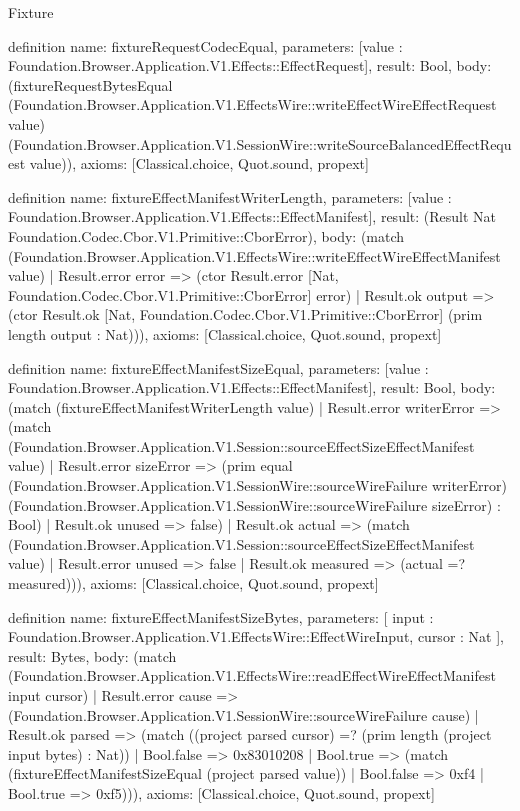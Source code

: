 \begin{lexlean}{Fixture}
\begin{semanticmodule}
definition{
  name: fixtureRequestCodecEqual,
  parameters: [value : Foundation.Browser.Application.V1.Effects::EffectRequest],
  result: Bool,
  body: (fixtureRequestBytesEqual (Foundation.Browser.Application.V1.EffectsWire::writeEffectWireEffectRequest value) (Foundation.Browser.Application.V1.SessionWire::writeSourceBalancedEffectRequest value)),
  axioms: [Classical.choice, Quot.sound, propext]
}

definition{
  name: fixtureEffectManifestWriterLength,
  parameters: [value : Foundation.Browser.Application.V1.Effects::EffectManifest],
  result: (Result Nat Foundation.Codec.Cbor.V1.Primitive::CborError),
  body: (match (Foundation.Browser.Application.V1.EffectsWire::writeEffectWireEffectManifest value)
    | Result.error error => (ctor Result.error [Nat, Foundation.Codec.Cbor.V1.Primitive::CborError] error)
    | Result.ok output => (ctor Result.ok [Nat, Foundation.Codec.Cbor.V1.Primitive::CborError] (prim length output : Nat))),
  axioms: [Classical.choice, Quot.sound, propext]
}

definition{
  name: fixtureEffectManifestSizeEqual,
  parameters: [value : Foundation.Browser.Application.V1.Effects::EffectManifest],
  result: Bool,
  body: (match (fixtureEffectManifestWriterLength value)
    | Result.error writerError => (match (Foundation.Browser.Application.V1.Session::sourceEffectSizeEffectManifest value)
      | Result.error sizeError => (prim equal (Foundation.Browser.Application.V1.SessionWire::sourceWireFailure writerError) (Foundation.Browser.Application.V1.SessionWire::sourceWireFailure sizeError) : Bool)
      | Result.ok unused => false)
    | Result.ok actual => (match (Foundation.Browser.Application.V1.Session::sourceEffectSizeEffectManifest value)
      | Result.error unused => false
      | Result.ok measured => (actual =? measured))),
  axioms: [Classical.choice, Quot.sound, propext]
}

definition{
  name: fixtureEffectManifestSizeBytes,
  parameters: [
    input : Foundation.Browser.Application.V1.EffectsWire::EffectWireInput,
    cursor : Nat
  ],
  result: Bytes,
  body: (match (Foundation.Browser.Application.V1.EffectsWire::readEffectWireEffectManifest input cursor)
    | Result.error cause => (Foundation.Browser.Application.V1.SessionWire::sourceWireFailure cause)
    | Result.ok parsed => (match ((project parsed cursor) =? (prim length (project input bytes) : Nat))
      | Bool.false => 0x83010208
      | Bool.true => (match (fixtureEffectManifestSizeEqual (project parsed value))
        | Bool.false => 0xf4
        | Bool.true => 0xf5))),
  axioms: [Classical.choice, Quot.sound, propext]
}


\end{semanticmodule}
\end{lexlean}
